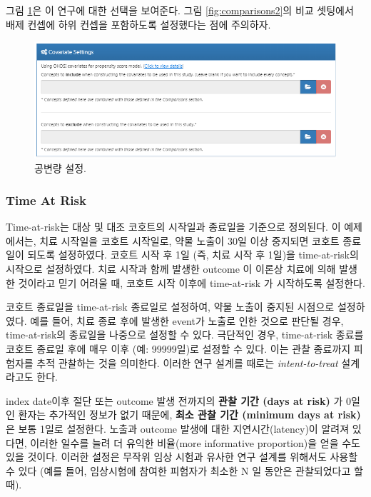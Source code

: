 \documentclass[11pt]{book}
\theoremstyle{definition}
\theoremstyle{definition}
\theoremstyle{definition}
\theoremstyle{remark}
\begin{document}
그림 \ref{fig:covariateSettings}은 이 연구에 대한 선택을 보여준다. 그림
\ref{fig:comparisons2}의 비교 셋팅에서 배제 컨셉에 하위 컨셉을
포함하도록 설정했다는 점에 주의하자.

\begin{figure}

{\centering \includegraphics[width=1\linewidth]{images/PopulationLevelEstimation/covariateSettings} 

}

\caption{공변량 설정.}\label{fig:covariateSettings}
\end{figure}

\subsubsection*{Time At Risk}\label{time-at-risk-2}

Time-at-risk는 대상 및 대조 코호트의 시작일과 종료일을 기준으로
정의된다. 이 예제에서는, 치료 시작일을 코호트 시작일로, 약물 노출이 30일
이상 중지되면 코호트 종료일이 되도록 설정하였다. 코호트 시작 후 1일 (즉,
치료 시작 후 1일)을 time-at-risk의 시작으로 설정하였다. 치료 시작과 함께
발생한 outcome 이 이론상 치료에 의해 발생한 것이라고 믿기 어려울 때,
코호트 시작 이후에 time-at-risk 가 시작하도록 설정한다.

코호트 종료일을 time-at-risk 종료일로 설정하여, 약물 노출이 중지된
시점으로 설정하였다. 예를 들어, 치료 종료 후에 발생한 event가 노출로
인한 것으로 판단될 경우, time-at-risk의 종료일을 나중으로 설정할 수
있다. 극단적인 경우, time-at-risk 종료를 코호트 종료일 후에 매우 이후
(예: 99999일)로 설정할 수 있다. 이는 관찰 종료까지 피험자를 추적
관찰하는 것을 의미한다. 이러한 연구 설계를 때로는 \emph{intent-to-treat}
설계라고도 한다.

index date이후 절단 또는 outcome 발생 전까지의 \textbf{관찰 기간 (days
at risk)} 가 0일인 환자는 추가적인 정보가 없기 때문에, \textbf{최소 관찰
기간 (minimum days at risk)} 은 보통 1일로 설정한다. 노출과 outcome
발생에 대한 지연시간(latency)이 알려져 있다면, 이러한 일수를 늘려 더
유익한 비율(more informative proportion)을 얻을 수도 있을 것이다. 이러한
설정은 무작위 임상 시험과 유사한 연구 설계를 위해서도 사용할 수 있다
(예를 들어, 임상시험에 참여한 피험자가 최소한 N 일 동안은 관찰되었다고
할 때).
\end{document}
